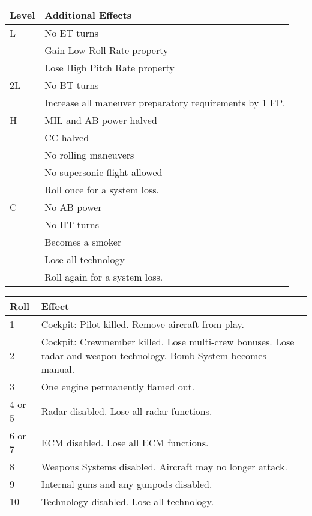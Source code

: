 \documentclass[10pt]{article}
\begin{document}
\begin{table}
\label{table:damage-effects}
\begin{tabular}{lp{7cm}}
\hline
Level&Additional Effects\\
\hline
L
&No ET turns\\
&Gain Low Roll Rate property\\
&Lose High Pitch Rate property\\
\hline
2L
&No BT turns\\
&Increase all maneuver preparatory requirements by 1 FP.\\
\hline
H
&MIL and AB power halved\\
&CC halved\\
&No rolling maneuvers\\
&No supersonic flight allowed\\
&Roll once for a system loss.\\
\hline
C
&No AB power\\
&No HT turns\\
&Becomes a smoker\\
&Lose all technology\\
&Roll again for a system loss.\\
\hline
\end{tabular}
\end{table}

\begin{table}
\label{table:system-loss}
\begin{tabular}{lp{7cm}}
\hline
Roll&Effect\\
\hline
1& Cockpit: Pilot killed. Remove aircraft from play.\\
2& Cockpit: Crewmember killed. Lose multi-crew
bonuses. Lose radar and weapon technology.
Bomb System becomes manual.\\
3& One engine permanently flamed out.\\
4 or 5& Radar disabled. Lose all radar functions.\\
6 or 7& ECM disabled. Lose all ECM functions.\\
8& Weapons Systems disabled. Aircraft may no longer
attack.\\
9& Internal guns and any gunpods disabled.\\
10& Technology disabled. Lose all technology.\\
\hline
\end{tabular}
\end{table}
\end{document}
